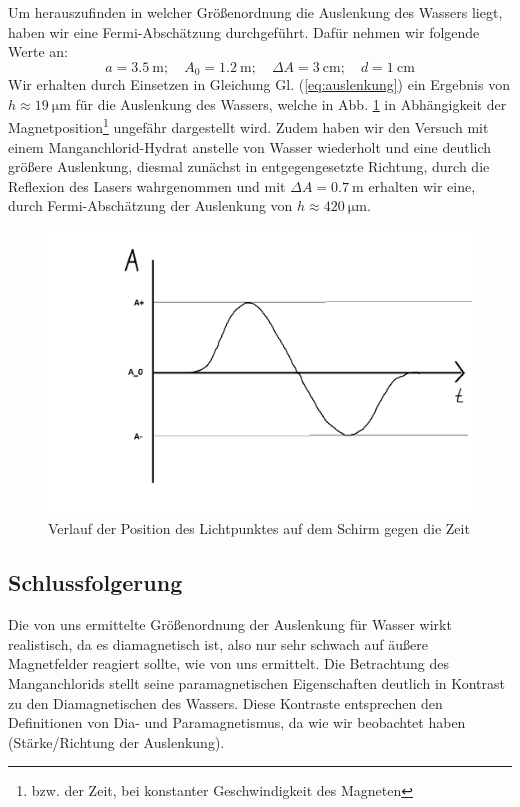 \documentclass[11pt,a4paper,titlepage, ngerman]{article}
\newcommand{\refeq}[1]{Gl. (\ref{eq:#1})}
\begin{document}
			Um herauszufinden in welcher Größenordnung die Auslenkung des Wassers liegt, haben wir eine Fermi-Abschätzung durchgeführt.
			Dafür nehmen wir folgende Werte an:
			\begin{equation*}
				a = \SI{3,5}{\meter};\quad
				A_0 = \SI{1,2}{\meter};\quad
				\Delta A = \SI{3}{\centi\meter};\quad
				d = \SI{1}{\centi\meter}
			\end{equation*}
			Wir erhalten durch Einsetzen in Gleichung \refeq{auslenkung} ein Ergebnis von $h \approx \SI{19}{\micro\meter}$ für die Auslenkung des Wassers, welche in Abb. \ref{fig:zeitverlauf} in Abhängigkeit der Magnetposition\footnote{bzw. der Zeit, bei konstanter Geschwindigkeit des Magneten} ungefähr dargestellt wird. Zudem haben wir den Versuch mit einem Manganchlorid-Hydrat anstelle von Wasser wiederholt und eine deutlich größere Auslenkung, diesmal zunächst in entgegengesetzte Richtung, durch die Reflexion des Lasers wahrgenommen und mit $\Delta A = \SI{0,7}{\meter}$ erhalten wir eine, durch Fermi-Abschätzung der Auslenkung von $h \approx \SI{420}{\micro\meter}$.
			
			\begin{figure}[ht]
				\includegraphics[width=\textwidth]{SkizzeZeitverlaufLichtpunktWasser.png}
				\caption{Verlauf der Position des Lichtpunktes auf dem Schirm gegen die Zeit}
				\label{fig:zeitverlauf}
			\end{figure}

		\subsection*{Schlussfolgerung}
								
			Die von uns ermittelte Größenordnung der Auslenkung für Wasser wirkt realistisch, da es diamagnetisch ist, also nur sehr schwach auf äußere Magnetfelder reagiert sollte, wie von uns ermittelt. Die Betrachtung des Manganchlorids stellt seine paramagnetischen Eigenschaften deutlich in Kontrast zu den Diamagnetischen des Wassers. Diese Kontraste entsprechen den Definitionen von Dia- und Paramagnetismus, da wie wir beobachtet haben (Stärke/Richtung der Auslenkung). 
			
\end{document}
